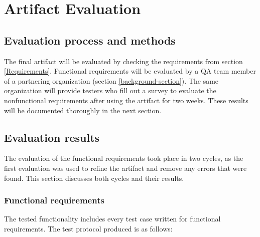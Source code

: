 
\chapter{Artifact Evaluation} 

\label{Chapter6} 

\section{Evaluation process and methods}

The final artifact will be evaluated by checking the requirements from section \ref{Requirements}. 
Functional requirements will be evaluated by a QA team member of a partnering organization (section \ref{background-section}).
The same organization will provide testers who fill out a survey to evaluate the nonfunctional requirements after using the artifact for two weeks. 
These results will be documented thoroughly in the next section.

\section{Evaluation results}

The evaluation of the functional requirements took place in two cycles, as the first evaluation was used to refine the artifact and remove any errors that were found. 
This section discusses both cycles and their results.

\subsection{Functional requirements}

The tested functionality includes every test case written for functional requirements. 
The test protocol produced is as follows:

